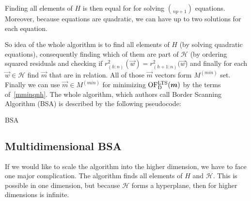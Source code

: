 Finding all elements of $H$ is then equal for for solving $\choose{n}{p+1}$ equations. Moreover, because equations are quadratic, we can have up to two solutions for each equation.

So idea of the whole algorithm is to find all elements of $H$ (by solving quadratic equations), consequently finding which of them are part of $\mathcal{H}$ (by ordering squared residuals and checking if $r^{2}_{(h:n)}(\vec{w}) = r^{2}_{(h+1:n)}(\vec{w}$) and finally for each $\vec{w} \in \mathcal{H}$ find $\vec{m}$ that are in relation. All of those $\vec{m}$ vectors form $M^{(min)}$ set. Finally we can use $\vec{m} \in M^{(min)}$ for minimizing $\operatorname{OF^{LTS}_D}(\boldsymbol{m})$ by the terms of~\eqref{mminqnh}. The whole algorithm, which authors call Border Scanning Algorithm (BSA) is described by the following pseudocode:

\begin{algorithm}[H]
    \label{alg:border:scanning:bsa:onedim}

      \caption{BSA}


      

    \;
\end{algorithm}


\subsection{Multidimensional BSA}

If we would like to scale the algorithm into the higher dimension, we have to face one major complication. The algorithm finds all elements of $H$ and $\mathcal{H}$. This is possible in one dimension, but because $\mathcal{H}$ forms a hyperplane, then for higher dimensions is infinite.

